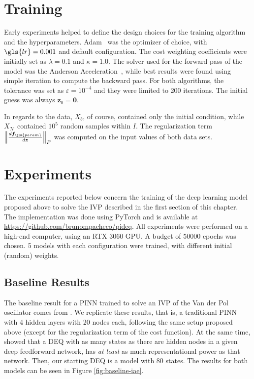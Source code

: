 \section{Training}

Early experiments helped to define the design choices for the training algorithm and the hyperparameters.
Adam~\cite{kingma_adam_2015} was the optimizer of choice, with $\gls{lr}=0.001$ and default configuration.
The cost weighting coefficients were initially set as $\lambda=0.1$ and $\kappa=1.0$.
The solver used for the forward pass of the model was the Anderson Acceleration~\cite{walker_anderson_2011}, while best results were found using simple iteration to compute the backward pass.
For both algorithms, the tolerance was set as $\varepsilon=10^{-4}$ and they were limited to 200 iterations.
The initial guess was always $\bm{z}_0=\bm{0}$.

In regards to the data, $X_b$, of course, contained only the initial condition, while $X_{\mathcal{N}}$ contained $10^5$ random samples within $I$.
The regularization term $\left\lVert \frac{d \bm{f}_{\gls{param}}}{d \bm{z}}\right\rVert_F$ was computed on the input values of both data sets.

\section{Experiments}

The experiments reported below concern the training of the deep learning model proposed above to solve the \gls{IVP} described in the first section of this chapter.
The implementation was done using PyTorch \cite{paszke_pytorch_2019} and is available at \url{https://github.com/brunompacheco/pideq}.
All experiments were performed on a high-end computer, using an RTX 3060 GPU.
A budget of 50000 epochs was chosen.
5 models with each configuration were trained, with different initial (random) weights.

\subsection{Baseline Results}

The baseline result for a \gls{PINN} trained to solve an \gls{IVP} of the Van der Pol oscillator comes from \textcite{Antonelo2021}.
We replicate these results, that is, a traditional \gls{PINN} with 4 hidden layers with 20 nodes each, following the same setup proposed above (except for the regularization term of the cost function).
At the same time, \textcite{Ghaoui2019} showed that a \gls{DEQ} with as many states as there are hidden nodes in a given deep feedforward network, has \emph{at least} as much representational power as that network.
Then, our starting \gls{DEQ} is a model with 80 states.
The results for both models can be seen in Figure \ref{fig:baseline-iae}.

